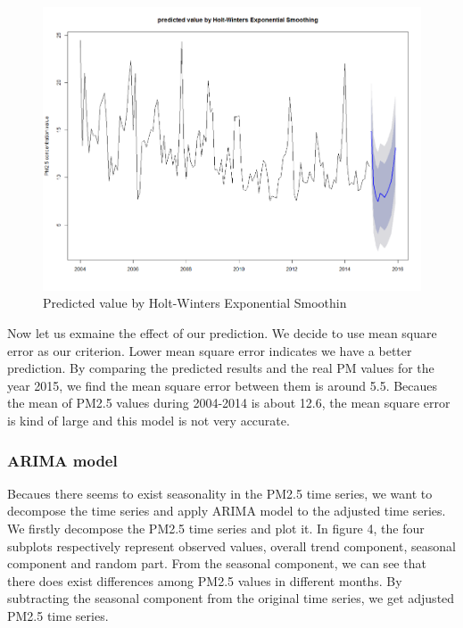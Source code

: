 \documentclass[10pt]{article}
\begin{document}
\begin{figure}[ht!]
\centering
\includegraphics[width = 150mm]{ts3.png}
\caption{Predicted value by Holt-Winters Exponential Smoothin}
\end{figure}

Now let us exmaine the effect of our prediction. We decide to use mean square error as our criterion. Lower mean square error indicates we have a better prediction. By comparing the predicted results and the real PM values for the year 2015, we find the mean square error between them is around 5.5. Becaues the mean of PM2.5 values during 2004-2014 is about 12.6, the mean square error is kind of large and this model is not very accurate.

\subsubsection{ARIMA model}
  Becaues there seems to exist seasonality in the PM2.5 time series, we want to decompose the time series and apply ARIMA model to the adjusted time series. We firstly decompose the PM2.5 time series and plot it. In figure 4, the four subplots respectively represent observed values, overall trend component, seasonal component and random part. From the seasonal component, we can see that there does exist differences among PM2.5 values in different months. By subtracting the seasonal component from the original time series, we get adjusted PM2.5 time series.
\end{document}
